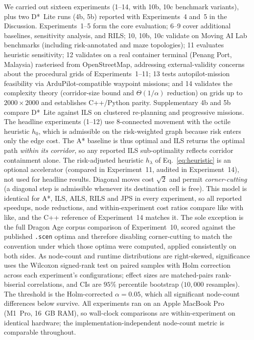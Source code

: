 \documentclass[preprint,12pt,authoryear]{elsarticle}
\begin{document}
We carried out sixteen experiments (1--14, with 10b, 10c benchmark variants), plus two D*~Lite runs (4b, 5b) reported with Experiments~4 and~5 in the Discussion. Experiments~1--5 form the core evaluation; 6--9 cover additional baselines, sensitivity analysis, and RILS; 10, 10b, 10c validate on Moving AI Lab benchmarks (including risk-annotated and maze topologies); 11 evaluates heuristic sensitivity; 12 validates on a real container terminal (Penang Port, Malaysia) rasterised from OpenStreetMap, addressing external-validity concerns about the procedural grids of Experiments~1--11; 13 tests autopilot-mission feasibility via ArduPilot-compatible waypoint missions; and 14 validates the complexity theory (corridor-size bound and $\Theta(1/\alpha)$ reduction) on grids up to $2000 \times 2000$ and establishes C++/Python parity. Supplementary 4b and 5b compare D*~Lite against ILS on clustered re-planning and progressive missions.
The headline experiments (1--12) use 8-connected movement with the octile heuristic $h_0$, which is admissible on the risk-weighted graph because risk enters only the edge cost. The A* baseline is thus optimal and ILS returns the optimal path \emph{within its corridor}, so any reported ILS sub-optimality reflects corridor containment alone. The risk-adjusted heuristic $h_\lambda$ of Eq.~\eqref{eq:heuristic} is an optional accelerator (compared in Experiment~11, audited in Experiment~14), not used for headline results.
Diagonal moves cost $\sqrt{2}$ and permit \emph{corner-cutting} (a diagonal step is admissible whenever its destination cell is free). This model is identical for A*, ILS, AILS, RILS and JPS in every experiment, so all reported speedups, node reductions, and within-experiment cost ratios compare like with like, and the C++ reference of Experiment~14 matches it. The sole exception is the full Dragon Age corpus comparison of Experiment~10, scored against the published \texttt{.scen} optima and therefore disabling corner-cutting to match the convention under which those optima were computed, applied consistently on both sides.
As node-count and runtime distributions are right-skewed, significance uses the Wilcoxon signed-rank test on paired samples with Holm correction across each experiment's configurations; effect sizes are matched-pairs rank-biserial correlations, and CIs are $95\%$ percentile bootstrap ($10{,}000$ resamples). The threshold is the Holm-corrected $\alpha = 0.05$, which all significant node-count differences below survive. All experiments ran on an Apple MacBook Pro (M1~Pro, 16~GB RAM), so wall-clock comparisons are within-experiment on identical hardware; the implementation-independent node-count metric is comparable throughout.
\end{document}
